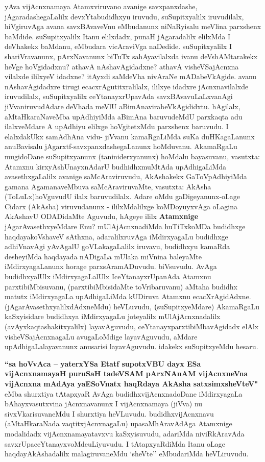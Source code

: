 \begin{artha}
yAva vijAcnxnamaya Atamxviruvano avanige savxpanxdashe,
jAgaradashegaLalilx devxYtabudidhxyu iruvudu, suSupitxyalilx
iruvudilalx, hiVgiruvAga avana savxBAvaveVnu eMbudanunx niNaRyisalu
meVlina parxshenx baMdide. suSupitxyalilx Itanu elilxdadx, punaH
jAgaradalilx elilxMda I deVhakekx baMdanu, eMbudara vicAraviVga
naDedide. suSupitxyalilx I shariVravanunx, pArxNavanunx biTuTx
sahAyavilalxda ivanu deVshAMtarakekx heVge hoVgidadxnu? athavA
nAshavAgidadxne? athavA visheVSajAcnxna vilalxde ililxyeV idadxne?
itAyxdi saMdeVha nivAraNe mADabeVkAgide. avanu nAshavAgidadxre tirugi
ecacxrAgutitxralilalx, ililxye idadxre jAcnxnavilalxde iruvudilalx,
suSupitxyalilx ceYtanayxrUpavAda savxBAvavuLaLxvanAgi
jiVvaniruvudAdare deVhada meVlU aBimAnavirabeVkAgididxtu. hAgilalx,
aMtaHkaraNaveMba upAdhiyiMda aBimAna baruvudeMdU parxkaqta adu
ilalxveMdare  A upAdhiyu elilxge hoVgitetxMdu parxshenx
baruvudu. I elalxdakUkx samAdhAna vidu- jiVvanu kamaRgaLiMda
suKa duHKagaLanunx anuBavisalu jAgarxtf-savxpanxdashegaLanunx
hoMduvanu. AkamaRgaLu mugidoDane suSupitxyanunx (taniniderxyanunx)
hoMdalu bayasuvanu, vasutxta: Atamxnu kirxyAshUnayxnAdarU
budhidhxmuMtAda upAdhigaLiMda avasethxgaLalilx avanige
saMcAraviruvudu, AkAshakekx GaToVpAdhiyiMda gamana AgamanaveMbuva
saMcAraviruvaMte, vasutxta: AkAsha (ToLuLx)\break hoVguvudU ilalx
baruvudilalx. Adare oMdu gaDigeyanunx-oLage Cidarx (AkAsha) viruvudanunx -
ililxMdalilxge koMDoyuyxvAga oLagina  AkAshavU ODADidaMte Aguvudu, hAgeye
ililx \textbf{Atamxnige} jAgarAvasethxyeMdare Enu? mUlAjAcnxnadiMda
huTiTxkoMDa budidhxge haqdayakoVshaveV sAthxna, adaralilxruvAga
iMdirxyagaLu budidhxge adhiVnavAgi yAvAgalU goVLakagaLalilx iruvavu,
budidhxyu kamaRda desheyiMda haqdayada nADigaLa mUlaka miVnina
baleyaMte iMdirxyagaLanunx horage parxsAramADuvudu. biVsuvudu. AvAga
budidhxyalUlx iMdirxyagaLalUlx IceYtanayxrUpanAda Atamxnu
parxtibiMbisuvanu, (parxtibiMbisidaMte toVribaruvanu) aMtaha budidhx
matutx iMdirxyagaLa upAdhigaLiMda kUDiruva Atamxnu
ecacXrAgidAdxne. (jAgarAvasethxyalilxdAdxneMdu) heVLuvudu,
 \textbf(suSupitxyeMdare) AkamaRgaLu kaSxyisidare budidhxya
iMdirxyagaLu joteyalilx mUlAjAcnxnadalilx (avAyxkaqtashakitxyalilx)
layavAguvudu, ceYtanayxparxtibiMbavAgidadx elAlx visheVSajAcnxnagaLu
avugaLoMdige layavAguvudu, aMdare upAdhigaLalayavanunx
anusarisi layavAguvudu. idakekx suSupitxyeMdu hesaru.
\end{artha}

\begin{artha}
\textbf{``sa hoVvAca \mdash -- yaterxYSa Etatf supotxV\s BU dayx ESa vijAcnxnamayaH
puruSaH tadeVSAM pArxNAnAM vijAcnxneVna vijAcnxna mAdAya ya\break ESoV\s natx
haqRdaya AkAsha satxsimxsheVteV"} eMba shurxtiya tAtapxyaR  \mdash  \mdash AvAga
budidhxvijAcnxnadoDane iMdirxyagaLa bAhayxvasutxvina jAcnxnavanunx I
vijAcnxnamaya (jiVva) nu sivxVkarisuvaneMdu I shurxtiya
heVLuvudu. budidhxvijAcnxnavu (aMtaHkaraNada vaqtitxjAcnxnagaLu)
upasaMhAravAdAga Atamxnige modalidadx
vijAcnxnamayatavxvu kaSxyisuvudu, adariMda niviRkAravAda
savxrUpaceYtanayxvoMde\break uLiyuvudu. I tAtapxyaRdiMda Itanu oLage
haqdayAkAshadalilx malagiruvaneMdu `sheVte'' eMbudariMda heVLiruvudu.
\end{artha}

